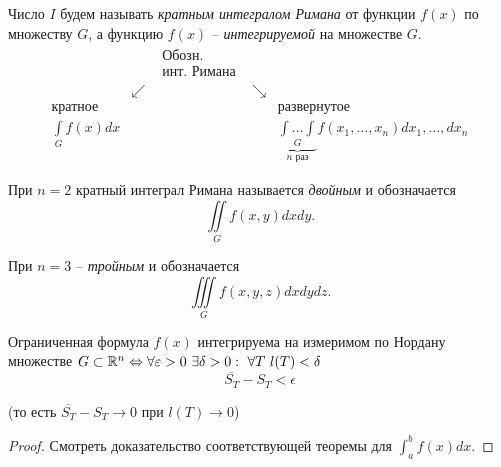 \begin{note}
    Число $ I $ будем называть \emph{кратным интегралом Римана} от функции $ f(x) $ по множеству $ G $, а функцию $ f(x) $ -- \emph{интегрируемой} на множестве $ G $.
    \[
        \begin{array}{ccccc}
                                      &          & \begin{array}{cc}
                                                       \text{Обозн.} \\
                                                       \text{инт. Римана}
                                                   \end{array} &          &                                                                                                    \\
                                      & \swarrow &                    & \searrow &                                                                                             \\
            \text{кратное}            &          &                    &          & \text{развернутое}                                                                          \\
            \underset{G}{\int} f(x)dx &          &                    &          & \underbrace{\underset{G}{\int\ldots\int}}_{n \text{ раз}}f(x_1,\ldots,x_n)dx_1,\ldots,d x_n
        \end{array}
    \]

    При $ n=2 $ кратный интеграл Римана называется \emph{двойным} и обозначается
    \[
        \iint\limits_G f(x,y)dxdy.
    \]

    При $ n=3 $ -- \emph{тройным} и обозначается
    \[
        \iiint\limits_G f(x,y,z)dxdydz.
    \]
\end{note}

\begin{theorem}
    Ограниченная формула $ f(x) $ интегрируема на измеримом по Нордану множестве $ G \subset \R^n \iff \forall \epsilon > 0 \ \exists\delta > 0: \ \forall T \ l(T)<\delta$
    \[
        \overline{S_T} - S_T < \epsilon
    \]
    \begin{center}
        (то есть $ \overline{S_T} - S_T \rightarrow 0 $ при $ l(T) \rightarrow 0 $)
    \end{center}
\end{theorem}

\begin{proof}
    Смотреть доказательство соответствующей теоремы для $ \int_{a}^{b}f(x)dx $.
\end{proof}

